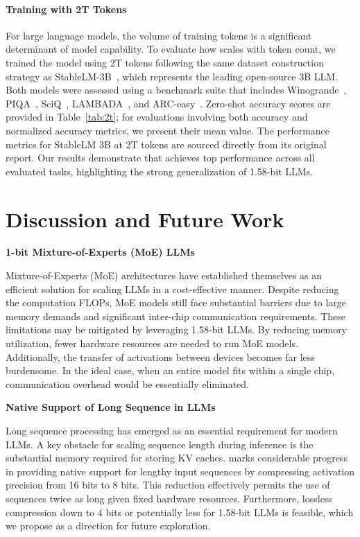 \paragraph{Training with 2T Tokens}

For large language models, the volume of training tokens is a significant determinant of model capability. To evaluate how  scales with token count, we trained the model using 2T tokens following the same dataset construction strategy as StableLM-3B~\cite{StableLM-3B-4E1T}, which represents the leading open-source 3B LLM. Both models were assessed using a benchmark suite that includes Winogrande~\cite{winoGrande}, PIQA~\cite{piqa}, SciQ~\cite{sciq}, LAMBADA~\cite{lambada}, and ARC-easy~\cite{arc}. Zero-shot accuracy scores are provided in Table~\ref{tab:2t}; for evaluations involving both accuracy and normalized accuracy metrics, we present their mean value. The performance metrics for StableLM 3B at 2T tokens are sourced directly from its original report. Our results demonstrate that  achieves top performance across all evaluated tasks, highlighting the strong generalization of 1.58-bit LLMs.

\section{Discussion and Future Work}

\textbf{1-bit Mixture-of-Experts (MoE) LLMs}

Mixture-of-Experts (MoE) architectures have established themselves as an efficient solution for scaling LLMs in a cost-effective manner. Despite reducing the computation FLOPs, MoE models still face substantial barriers due to large memory demands and significant inter-chip communication requirements. These limitations may be mitigated by leveraging 1.58-bit LLMs. By reducing memory utilization, fewer hardware resources are needed to run MoE models. Additionally, the transfer of activations between devices becomes far less burdensome. In the ideal case, when an entire model fits within a single chip, communication overhead would be essentially eliminated.

\textbf{Native Support of Long Sequence in LLMs}

Long sequence processing has emerged as an essential requirement for modern LLMs. A key obstacle for scaling sequence length during inference is the substantial memory required for storing KV caches.  marks considerable progress in providing native support for lengthy input sequences by compressing activation precision from 16 bits to 8 bits. This reduction effectively permits the use of sequences twice as long given fixed hardware resources. Furthermore, lossless compression down to 4 bits or potentially less for 1.58-bit LLMs is feasible, which we propose as a direction for future exploration.

